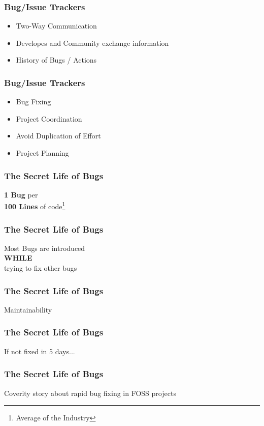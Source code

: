 \documentclass[18pt]{beamer}
\begin{document}
\begin{frame}
\frametitle{Bug/Issue Trackers}
\Huge
\begin{itemize}
\item Two-Way Communication
\pause
\item Developes and Community exchange information
\pause
\item History of Bugs / Actions
\end{itemize}
\end{frame}


\begin{frame}
\frametitle{Bug/Issue Trackers}
\Huge
\begin{itemize}
\item Bug Fixing
\pause
\item Project Coordination
\pause
\item Avoid Duplication of Effort
\pause
\item Project Planning
\end{itemize}
\end{frame}


\begin{frame}
\frametitle{The Secret Life of Bugs}
\Huge
\begin{center}
\textbf{1 Bug} per\\
\bigskip
\textbf{100 Lines} of code\footnote{Average of the Industry}
\end{center}
\end{frame}


\begin{frame}
\frametitle{The Secret Life of Bugs}
\Huge
Most Bugs are introduced\\
\bigskip
\pause
\textbf{WHILE}\\
\bigskip
trying to fix other bugs
\end{frame}


\begin{frame}
\frametitle{The Secret Life of Bugs}
\Huge
Maintainability
\end{frame}



\begin{frame}
\frametitle{The Secret Life of Bugs}
\Huge
If not fixed in 5 days...
\end{frame}


\begin{frame}
\frametitle{The Secret Life of Bugs}
\Huge
Coverity story about rapid bug fixing in FOSS projects
\end{frame}
\end{document}
